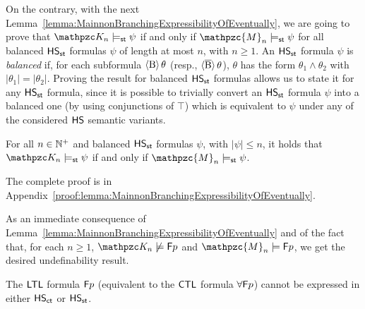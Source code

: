 On the contrary, with the next Lemma~\ref{lemma:MainnonBranchingExpressibilityOfEventually}, we are going to prove that  $\Ku_n\models_\stat \psi$ if and only if $\mathpzc{M}_n\models_\stat \psi$ for all balanced $\text{\sffamily HS}_{\mathsf{st}}$ formulas $\psi$ of length at most $n$, with $n\geq 1$. 
An $\text{\sffamily HS}_{\mathsf{st}}$ formula $\psi$ is \emph{balanced} if, for each subformula $\operatorname{\langle B\rangle} \theta $ (resp., $\operatorname{\langle \overline{B}\rangle} \theta $), $\theta$ has the form $\theta_1\wedge\theta_2$ with $|\theta_1| = |\theta_2|$. Proving the result for  balanced $\text{\sffamily HS}_{\mathsf{st}}$ formulas allows us to state it for any $\text{\sffamily HS}_{\mathsf{st}}$ formula, since it is possible to trivially 
convert an $\text{\sffamily HS}_{\mathsf{st}}$ formula $\psi$ into a balanced one (by using conjunctions of $\top$) which is equivalent to $\psi$ under any of the considered $\text{\sffamily HS}$ semantic variants.

\begin{lemma}\label{lemma:MainnonBranchingExpressibilityOfEventually} For all $n\in\mathbb{N}^+$ and balanced $\text{\sffamily HS}_{\mathsf{st}}$ formulas $\psi$, with $|\psi|\leq n$, 
it holds that $\Ku_n\models_\stat \psi$ if and only if $\mathpzc{M}_n\models_\stat \psi$.
\end{lemma}
The complete proof is in Appendix~\ref{proof:lemma:MainnonBranchingExpressibilityOfEventually}.

As an immediate consequence of Lemma~\ref{lemma:MainnonBranchingExpressibilityOfEventually} and of the fact that, for each $n\geq 1$,  $\Ku_n\not\models \Eventually p$ and $\mathpzc{M}_n\models \Eventually p$, we get the desired undefinability result.




\begin{proposition}\label{prop:nonBranchingExpressibilityOfEventually} 
The $\text{\sffamily LTL}$ formula $\textsf{F} p$ (equivalent to the $\text{\sffamily CTL}$ formula $\forall \textsf{F} p$) cannot be expressed in either $\text{\sffamily HS}_{\mathsf{ct}}$ or $\text{\sffamily HS}_{\mathsf{st}}$.
\end{proposition}

